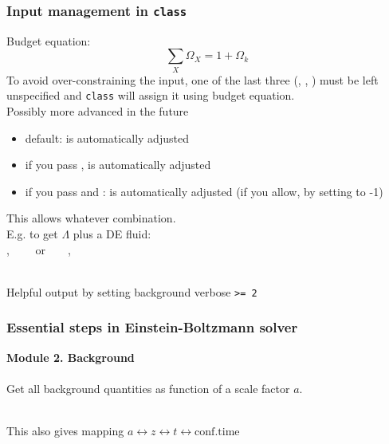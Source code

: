 \begin{frame}[fragile]
	\frametitle{Input management in {\tt \Red class}}
	
	{\Red Budget equation:}
	$$
	\sum_X \Omega_X = 1 + \Omega_k
	$$
	To avoid over-constraining the input, one of the last three (, , ) must be left unspecified and  {\tt \Red class} will assign it using budget equation.\\
	{\tiny Possibly more advanced in the future} 
	\begin{itemize}
		\item default:  is automatically adjusted
		\item if you pass ,    is automatically adjusted
		\item if you pass  and :  is automatically adjusted (if you allow, by setting to -1)
	\end{itemize}
	This allows whatever combination.\\
	E.g. to get $\Lambda$ plus a DE fluid: \\
	, ~~~~or~~~~, 
	
	\mbox{}\\
	Helpful output by setting background verbose \texttt{\textgreater= 2}
\end{frame}




\begin{frame}[fragile]
\frametitle{Essential steps in Einstein-Boltzmann solver}

{\bf Module 2. Background}\\
\mbox{}\\
Get all background quantities as function of a scale factor $a$.



\mbox{}\\
This also gives mapping $a \leftrightarrow z \leftrightarrow t \leftrightarrow \mathrm{conf. time}$\\

\end{frame}


